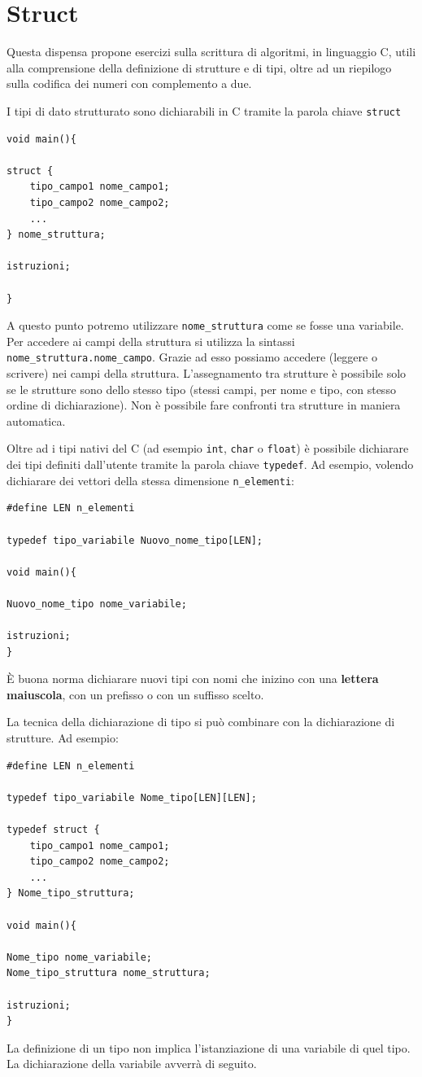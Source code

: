 \documentclass[oneside]{scrbook}
\begin{document}
\chapter{Struct}
Questa dispensa propone esercizi sulla scrittura di algoritmi, in linguaggio C, utili alla comprensione della definizione di strutture e di tipi, oltre ad un riepilogo sulla codifica dei numeri con complemento a due.

I tipi di dato strutturato sono dichiarabili in C tramite la parola chiave \texttt{struct}
\begin{lstlisting}[style=cstyle]
void main(){

struct {
	tipo_campo1 nome_campo1;
	tipo_campo2 nome_campo2;
	...
} nome_struttura;

istruzioni;

}
\end{lstlisting}		

A questo punto potremo utilizzare \texttt{nome\_struttura} come se fosse una variabile. Per accedere ai campi della struttura si utilizza la sintassi \texttt{nome\_struttura.nome\_campo}. Grazie ad esso possiamo accedere (leggere o scrivere) nei campi della struttura. L'assegnamento tra strutture \`e possibile solo se le strutture sono dello stesso tipo (stessi campi, per nome e tipo, con stesso ordine di dichiarazione). Non \`e possibile fare confronti tra strutture in maniera automatica.
		
Oltre ad i tipi nativi del C (ad esempio \texttt{int}, \texttt{char} o \texttt{float}) \`e possibile dichiarare dei tipi definiti dall'utente tramite la parola chiave \texttt{typedef}. Ad esempio, volendo dichiarare dei vettori della stessa dimensione \texttt{n\_elementi}:

\begin{lstlisting}[style=cstyle]
#define LEN n_elementi

typedef tipo_variabile Nuovo_nome_tipo[LEN];

void main(){

Nuovo_nome_tipo nome_variabile;

istruzioni;
}
\end{lstlisting}
\`E buona norma dichiarare nuovi tipi con nomi che inizino con una \textbf{lettera maiuscola}, con un prefisso o con un suffisso scelto.
		
La tecnica della dichiarazione di tipo si pu\`o combinare con la dichiarazione di strutture. Ad esempio:
\begin{lstlisting}[style=cstyle]
#define LEN n_elementi

typedef tipo_variabile Nome_tipo[LEN][LEN];

typedef struct {
	tipo_campo1 nome_campo1;
	tipo_campo2 nome_campo2;
	...
} Nome_tipo_struttura;

void main(){

Nome_tipo nome_variabile;
Nome_tipo_struttura nome_struttura;

istruzioni;
}
\end{lstlisting}
La definizione di un tipo non implica l'istanziazione di una variabile di quel tipo. La dichiarazione della variabile avverrà di seguito.
\end{document}

